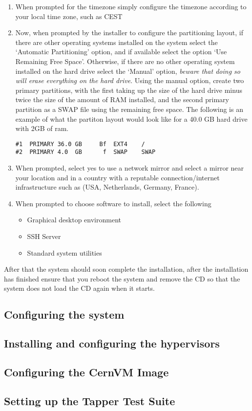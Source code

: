 \begin{enumerate}
\item When prompted for the timezone simply configure the timezone according to your local time zone, such as CEST

\item Now, when prompted by the installer to configure the partitioning layout, if there are other operating systems installed on the system 
select the `Automatic Partitioning' option, and if available select the option `Use Remaining Free Space'. Otherwise, if there are no other 
operating system installed on the hard drive select the `Manual' option, \emph{beware that doing so will erase everything on the hard drive}.
Using the manual option, create two primary partitions, with the first taking up the size of the hard drive minus twice the size of the amount
of RAM installed, and the second primary partition as a SWAP file using the remaining free space. The following is an example of what the partiton
layout would look like for a 40.0 GB hard drive with 2GB of ram.

\flushleft
\lstset{caption=Manual Partition Layout Example}
\begin{lstlisting}
#1	PRIMARY	36.0 GB		Bf	EXT4	/
#2	PRIMARY	4.0  GB		 f	SWAP	SWAP
\end{lstlisting}

\item When prompted, select yes to use a network mirror and select a mirror near your location and in a country with a reputable 
connection/internet infrastructure such as (USA, Netherlands, Germany, France).

\item When prompted to choose software to install, select the following
\begin{itemize}
\item 	Graphical desktop environment
\item 	SSH Server
\item	Standard system utilities
\end{itemize}
\end{enumerate}

\item After that the system should soon complete the installation, after the installation has finished ensure that you reboot the system and remove
the CD so that the system does not load the CD again when it starts.

\subsection{Configuring the system}
\subsection{Installing and configuring the hypervisors}
\subsection{Configuring the CernVM Image}
\subsection{Setting up the Tapper Test Suite}